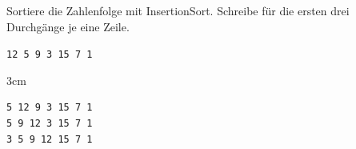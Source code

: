 \question[2]
Sortiere die Zahlenfolge mit InsertionSort.
Schreibe für die ersten drei Durchgänge je eine Zeile.

\texttt{12 5 9 3 15 7 1}

\begin{solutionbox}{3cm}
\begin{lstlisting}
5 12 9 3 15 7 1
5 9 12 3 15 7 1
3 5 9 12 15 7 1
\end{lstlisting}
\end{solutionbox}
